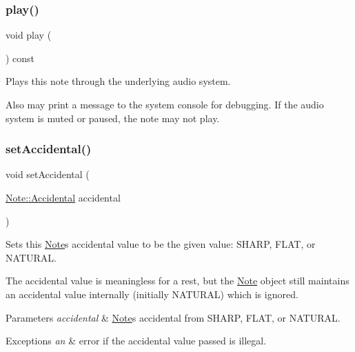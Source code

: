 \subsubsection{\texorpdfstring{play()}{play()}}
{\footnotesize\ttfamily void play (\begin{DoxyParamCaption}{ }\end{DoxyParamCaption}) const}



Plays this note through the underlying audio system. 

Also may print a message to the system console for debugging. If the audio system is muted or paused, the note may not play. \mbox{\label{classNote_a52c7937fb6be8e867177adb8dc2755ca}} 
\subsubsection{\texorpdfstring{set\+Accidental()}{setAccidental()}}
{\footnotesize\ttfamily void set\+Accidental (\begin{DoxyParamCaption}\item[{\mbox{\hyperlink{classNote_a48ac9ae5104f19cec526c22b5323f5d9}{Note\+::\+Accidental}}}]{accidental }\end{DoxyParamCaption})}



Sets this \mbox{\hyperlink{classNote}{Note}}\textquotesingle{}s accidental value to be the given value\+: S\+H\+A\+RP, F\+L\+AT, or N\+A\+T\+U\+R\+AL. 

The accidental value is meaningless for a rest, but the \mbox{\hyperlink{classNote}{Note}} object still maintains an accidental value internally (initially N\+A\+T\+U\+R\+AL) which is ignored. 
\begin{DoxyParams}{Parameters}
{\em accidental} & \mbox{\hyperlink{classNote}{Note}}\textquotesingle{}s accidental from S\+H\+A\+RP, F\+L\+AT, or N\+A\+T\+U\+R\+AL. \\
\hline
\end{DoxyParams}

\begin{DoxyExceptions}{Exceptions}
{\em an} & error if the accidental value passed is illegal. \\
\hline
\end{DoxyExceptions}
\mbox{\label{classNote_ae526af16e9c7c5cb703ece0cc6c88031}} 
